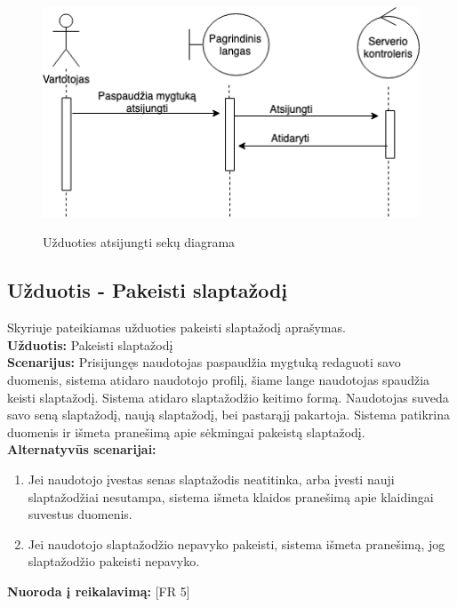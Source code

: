 \documentclass{VUMIFPSkursinis}
\begin{document}
			\begin{figure}[H]
		\centering
		\includegraphics[width=\linewidth]{img/logOffSequence.png}
		\label{fig:atsijungti}
		\caption{Užduoties atsijungti sekų diagrama}
	\end{figure}

	\subsection{Užduotis - Pakeisti slaptažodį}
	Skyriuje pateikiamas užduoties pakeisti slaptažodį aprašymas.\\
	\textbf{Užduotis:}  Pakeisti slaptažodį \\
	\textbf{Scenarijus:} Prisijungęs naudotojas paspaudžia mygtuką redaguoti savo duomenis, sistema atidaro naudotojo profilį, šiame lange naudotojas spaudžia keisti slaptažodį. Sistema atidaro slaptažodžio keitimo formą. Naudotojas suveda savo seną slaptažodį, naują slaptažodį, bei pastarąjį pakartoja. Sistema patikrina duomenis ir išmeta pranešimą apie sėkmingai pakeistą slaptažodį. \\
	\textbf{Alternatyvūs scenarijai:}
	\begin{enumerate}
		\item Jei naudotojo įvestas senas slaptažodis neatitinka, arba įvesti nauji slaptažodžiai nesutampa, sistema išmeta klaidos pranešimą apie klaidingai suvestus duomenis.
		\item Jei naudotojo slaptažodžio nepavyko pakeisti, sistema išmeta pranešimą, jog slaptažodžio pakeisti nepavyko.
	\end{enumerate}
	\textbf{Nuoroda į reikalavimą: } [FR 5]
	
\end{document}
